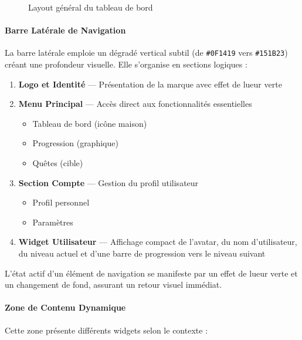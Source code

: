 \documentclass[12pt, a4paper]{report}
\begin{document}
\begin{figure}[H]
    \centering
    \caption{Layout général du tableau de bord}
    \label{fig:dashboard}
\end{figure}

\paragraph{Barre Latérale de Navigation}
La barre latérale emploie un dégradé vertical subtil (de \texttt{\#0F1419} vers \texttt{\#151B23}) créant une profondeur visuelle. Elle s'organise en sections logiques :

\begin{enumerate}
    \item \textbf{Logo et Identité} --- Présentation de la marque avec effet de lueur verte
    \item \textbf{Menu Principal} --- Accès direct aux fonctionnalités essentielles
    \begin{itemize}
        \item Tableau de bord (icône maison)
        \item Progression (graphique)
        \item Quêtes (cible)
    \end{itemize}
    \item \textbf{Section Compte} --- Gestion du profil utilisateur
    \begin{itemize}
        \item Profil personnel
        \item Paramètres
    \end{itemize}
    \item \textbf{Widget Utilisateur} --- Affichage compact de l'avatar, du nom d'utilisateur, du niveau actuel et d'une barre de progression vers le niveau suivant
\end{enumerate}

L'état actif d'un élément de navigation se manifeste par un effet de lueur verte et un changement de fond, assurant un retour visuel immédiat.

\paragraph{Zone de Contenu Dynamique}
Cette zone présente différents widgets selon le contexte :
\end{document}
